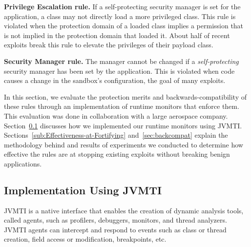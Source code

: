 \documentclass{sig-alternate}
\begin{document}
\noindent\textbf{Privilege Escalation rule.} If a self-protecting
security manager is set for the application, a class may not directly
load a more privileged class. This rule is violated when the protection
domain of a loaded class implies a permission that is not implied
in the protection domain that loaded it. About half of recent exploits
break this rule to elevate the privileges of their payload
class. 

\noindent \textbf{Security Manager rule.} The manager cannot
be changed if a \emph{self-protecting} security manager has been set
by the application. This is violated when code causes a change
in the sandbox's configuration, the goal of many exploits.



In this section, we evaluate the protection merits and backwards-compatibility
of these rules through an implementation of runtime monitors that
enforce them. This evaluation was done in collaboration with a large aerospace
company.
Section~\ref{sub:Implementation-Using-JVMTI} discusses how we implemented
our runtime monitors using JVMTI. Sections~\ref{sub:Effectiveness-at-Fortifying} and~\ref{sec:backcompat} explain the methodology behind and results of experiments we conducted
to determine how effective the rules are at stopping existing exploits without
breaking benign applications. 

\subsection{Implementation Using JVMTI}\label{sub:Implementation-Using-JVMTI}

JVMTI is a native interface that enables the creation of
dynamic analysis tools, called agents, such as profilers, debuggers, monitors, and thread
analyzers. JVMTI agents can intercept and respond to events such as class
or thread creation, field access or modification, breakpoints, etc.
\end{document}
